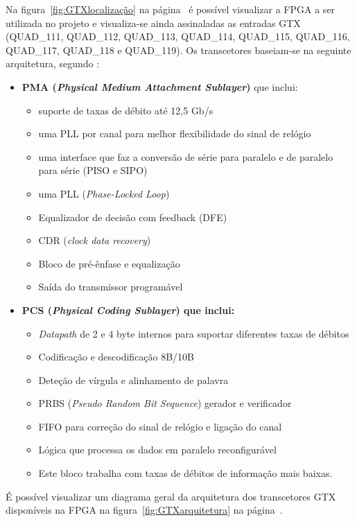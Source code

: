 Na figura~\ref{fig:GTXlocalização} na página~\pageref{fig:GTXlocalização} é possível visualizar a FPGA a ser utilizada no projeto e visualiza-se ainda assinaladas as entradas GTX (QUAD\_111, QUAD\_112, QUAD\_113, QUAD\_114, QUAD\_115, QUAD\_116, QUAD\_117, QUAD\_118 e QUAD\_119). 
Os transcetores baseiam-se na seguinte arquitetura, segundo \cite{R010}:
\begin{itemize}
	\item \textbf{PMA (\textit{Physical Medium Attachment Sublayer})} que inclui:
	\begin{itemize}
		\item suporte de taxas de débito até 12,5 Gb/s
		\item uma PLL por canal para melhor flexibilidade do sinal de relógio
		\item uma interface que faz a conversão de série para paralelo e de paralelo para série (PISO e SIPO)
		\item uma PLL (\textit{Phase-Locked Loop})
		\item Equalizador de decisão com feedback (DFE)
		\item CDR (\textit{clock data recovery})
		\item Bloco de pré-ênfase e equalização
		\item Saída do transmissor programável
	\end{itemize}
	\item \textbf{PCS (\textit{Physical Coding Sublayer}) que inclui:}
	\begin{itemize}
		\item \textit{Datapath} de 2 e 4 byte internos para suportar diferentes taxas de débitos
		\item Codificação e descodificação 8B/10B
		\item Deteção de vírgula e alinhamento de palavra
		\item PRBS (\textit{Pseudo Random Bit Sequence}) gerador e verificador
		\item FIFO para correção do sinal de relógio e ligação do canal
		\item Lógica que processa os dados em paralelo reconfigurável
		\item Este bloco trabalha com taxas de débitos de informação mais baixas.
	\end{itemize}
\end{itemize}

É possível visualizar um diagrama geral da arquitetura dos transcetores GTX disponíveis na FPGA na figura~\ref{fig:GTXarquitetura} na página~\pageref{fig:GTXarquitetura}.

